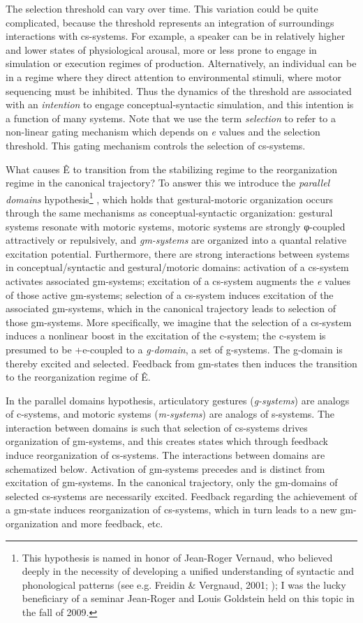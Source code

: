   The selection threshold can vary over time. This variation could be quite complicated, because the threshold represents an integration of surroundings interactions with cs-systems. For example, a speaker can be in relatively higher and lower states of physiological arousal, more or less prone to engage in simulation or execution regimes of production. Alternatively, an individual can be in a regime where they direct attention to environmental stimuli, where motor sequencing must be inhibited. Thus the dynamics of the threshold are associated with an \textit{intention} to engage conceptual-syntactic simulation, and this intention is a function of many systems. Note that we use the term \textit{selection} to refer to a non-linear gating mechanism which depends on \textit{e} values and the selection threshold. This gating mechanism controls the selection of cs-systems.

  What causes Ê to transition from the stabilizing regime to the reorganization regime in the canonical trajectory? To answer this we introduce the \textit{parallel domains} hypothesis\footnote{This hypothesis is named in honor of Jean-Roger Vernaud, who believed deeply in the necessity of developing a unified understanding of syntactic and phonological patterns (see e.g. Freidin \& Vergnaud, 2001; \citealt{Vergnaud1977}); I was the lucky beneficiary of a seminar Jean-Roger and Louis Goldstein held on this topic in the fall of 2009.} , which holds that gestural-motoric organization occurs through the same mechanisms as conceptual-syntactic organization: gestural systems resonate with motoric systems, motoric systems are strongly φ-coupled attractively or repulsively, and \textit{gm-systems} are organized into a quantal relative excitation potential. Furthermore, there are strong interactions between systems in conceptual/syntactic and gestural/motoric domains: activation of a cs-system activates associated gm-systems; excitation of a cs-system augments the \textit{e} values of those active gm-systems; selection of a cs-system induces excitation of the associated gm-systems, which in the canonical trajectory leads to selection of those gm-systems. More specifically, we imagine that the selection of a cs-system induces a nonlinear boost in the excitation of the c-system; the c-system is presumed to be +e-coupled to a \textit{g-domain}, a set of g-systems. The g-domain is thereby excited and selected. Feedback from gm-states then induces the transition to the reorganization regime of  Ê.

  In the parallel domains hypothesis, articulatory gestures (\textit{g-systems}) are analogs of c-systems, and motoric systems (\textit{m-systems}) are analogs of s-systems. The interaction between domains is such that selection of cs-systems drives organization of gm-systems, and this creates states which through feedback induce reorganization of cs-systems. The interactions between domains are schematized below. Activation of gm-systems precedes and is distinct from excitation of gm-systems. In the canonical trajectory, only the gm-domains of selected cs-systems are necessarily excited. Feedback regarding the achievement of a gm-state induces reorganization of cs-systems, which in turn leads to a new gm-organization and more feedback, etc.


